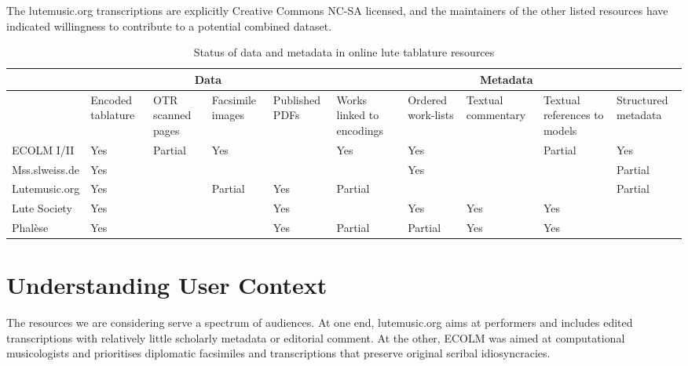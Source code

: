 \documentclass[sigconf, nonacm=true]{acmart}
\begin{document}
\begin{sloppypar}
  The lutemusic.org transcriptions are explicitly Creative Commons
  NC-SA licensed, and the maintainers of the other listed resources
  have indicated willingness to contribute to a potential combined
  dataset.
  
  \renewcommand{\arraystretch}{1.2}
  \setlength{\tabcolsep}{4pt}
  
  \begin{table}[t]
  \caption{Status of data and metadata in online lute tablature resources}
  \small
      \begin{tabularx}{\textwidth}{|l|X|X|X|X|X|X|X|X|X|}
        \hline
        & \multicolumn{4}{|c|}{\bf Data} & \multicolumn{5}{|c|}{\bf Metadata} \\
        \hline
        & Encoded tablature & OTR scanned pages & Facsimile images & Published PDFs
        & Works linked to encodings & Ordered work-lists & Textual commentary & Textual references to models & Structured metadata \\
        \hline
            {ECOLM I/II} & Yes & Partial & Yes & & Yes & Yes & & Partial & Yes \\
        \hline
            {Mss.slweiss.de} & Yes & & & & & Yes & & & Partial \\
        \hline
            {Lutemusic.org} & Yes & & Partial & Yes & Partial & & & & Partial \\
        \hline
            {Lute Society} & Yes &  & & Yes & & Yes & Yes & Yes & \\
        \hline
            {Phal\`ese} & Yes & & & Yes & Partial & Partial & Yes & Yes & \\
            \hline
      \end{tabularx}
  \label{table:datasets}
  \end{table}
  
  
  \section{Understanding User Context}\label{user-context}

  The resources we are considering serve a spectrum of audiences. At
  one end, lutemusic.org aims at performers and includes edited
  transcriptions with relatively little scholarly metadata or
  editorial comment. At the other, ECOLM was aimed at computational
  musicologists and prioritises diplomatic facsimiles and
  transcriptions that preserve original scribal idiosyncracies.


\end{sloppypar}
\end{document}
